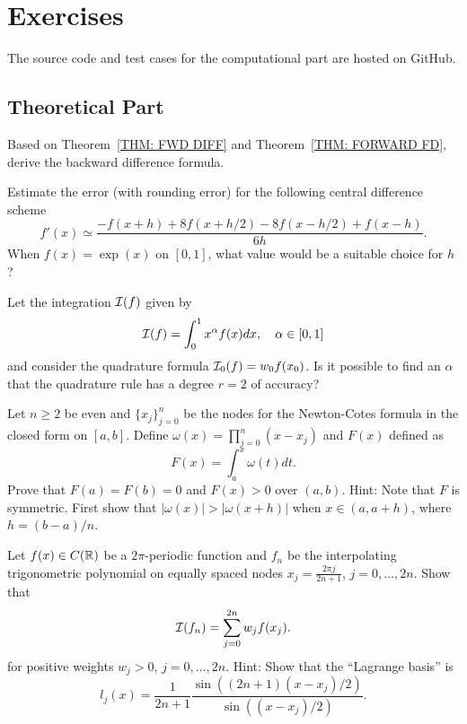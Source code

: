\begin{example}
    
\end{example}

\section{Exercises}
The source code and test cases for the computational part are hosted on GitHub.

\subsection{Theoretical Part}
\begin{problem}
\label{Prb: 3-Bac-Dif}
    Based on Theorem~\ref{THM: FWD DIFF} and Theorem~\ref{THM: FORWARD FD}, derive the backward difference formula.
\end{problem}
\begin{problem}
    Estimate the error (with rounding error) for the following central difference scheme
    $$f'(x)\simeq \frac{-f(x + h) + 8f(x + h/2) - 8 f(x - h/2) + f(x - h)}{6h}.$$
    When $f(x)=\exp(x)$ on $[0, 1]$, what value would be a suitable choice for $h$?
\end{problem}
\begin{problem}
    Let the integration $\mathcal I(f)$ given by
    $$\mathcal I(f) = \int_0^1 x^{\alpha} f(x) dx,\quad \alpha\in [0, 1]$$
    and consider the quadrature formula $\mathcal I_0(f) = w_0 f(x_0)$. Is it possible to find an $\alpha$ that the quadrature rule has a degree $r= 2$ of accuracy?
\end{problem}
\begin{problem}
\label{Prb: 3-Exe-4}
    Let $n\ge 2$ be even and $\{ x_j\}_{j=0}^n$ be the nodes for the Newton-Cotes formula in the closed form on $[a, b]$. Define $\omega(x)=\prod_{j=0}^n (x - x_j)$ and $F(x)$ defined as 
    $$F(x) = \int_a^x \omega(t)dt.$$
    Prove that $F(a) = F(b) = 0$ and $F(x) > 0$ over $(a ,b)$. 
    Hint: Note that $F$ is symmetric. First show that $|\omega(x)| > |\omega(x + h)|$ when $x\in (a, a + h)$, where $h = (b-a)/n$.
\end{problem}
\begin{problem}
    Let $f(x)\in C(\mathbb R)$ be a $2\pi$-periodic function and $f_n$ be the interpolating trigonometric polynomial on equally spaced nodes $x_j = \frac{2\pi j}{2n+1}$, $j=0,\dots, 2n$. Show that 
    \begin{equation}
       \mathcal I(f_n) = \sum_{j=0}^{2n} w_j f(x_j).
    \end{equation}
    for positive weights $w_j > 0$, $j = 0,\dots, 2n$.
    Hint: Show that the ``Lagrange basis'' is $$l_j(x) =\frac{1}{2n+1} \frac{\sin((2n+1)(x- x_j)/2)}{\sin((x-x_j)/2)}.$$
\end{problem}
